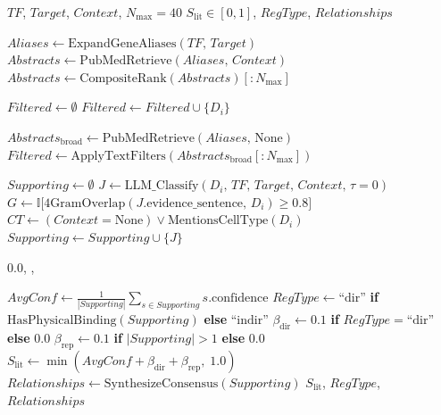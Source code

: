 \documentclass{article}
\begin{document}
\begin{algorithm}[H]
\caption{Reflexive Agentic Literature Validation and Scoring}
\label{alg:lit_val}
\begin{algorithmic}[1]
\Require $TF$, $Target$, $Context$, $N_{\max} = 40$
\Ensure $S_{\mathrm{lit}} \in [0,1]$, $RegType$, $Relationships$

\State $Aliases \leftarrow \mathrm{ExpandGeneAliases}(TF,\, Target)$
\State $Abstracts \leftarrow \mathrm{PubMedRetrieve}(Aliases,\, Context)$
\State $Abstracts \leftarrow \mathrm{CompositeRank}(Abstracts)[:N_{\max}]$

\State $Filtered \leftarrow \emptyset$
      \State $Filtered \leftarrow Filtered \cup \{D_i\}$
    \EndIf
  \EndIf
\EndFor

  \State {}
  \State $Abstracts_{\mathrm{broad}} \leftarrow \mathrm{PubMedRetrieve}(Aliases,\, \text{None})$
  \State $Filtered \leftarrow \mathrm{ApplyTextFilters}(Abstracts_{\mathrm{broad}}[:N_{\max}])$
\EndIf

\State $Supporting \leftarrow \emptyset$
  \State $J \leftarrow \mathrm{LLM\_Classify}(D_i,\, TF,\, Target,\, Context,\, \tau{=}0)$
    \State $G \leftarrow \mathbb{I}\bigl[\mathrm{4GramOverlap}(J.\mathrm{evidence\_sentence},\, D_i) \ge 0.8\bigr]$
    \State $CT \leftarrow (Context = \text{None}) \vee \mathrm{MentionsCellType}(D_i)$
      \State $Supporting \leftarrow Supporting \cup \{J\}$
    \EndIf
  \EndIf
\EndFor

  \State \Return $0.0$, , 
\EndIf

\State $AvgConf \leftarrow \tfrac{1}{|Supporting|} \displaystyle\sum_{s \in Supporting} s.\mathrm{confidence}$
\State $RegType \leftarrow \text{``dir''}$ \textbf{if} $\mathrm{HasPhysicalBinding}(Supporting)$
       \textbf{else} $\text{``indir''}$
\State $\beta_{\mathrm{dir}} \leftarrow 0.1$ \textbf{if} $RegType = \text{``dir''}$ \textbf{else} $0.0$
\State $\beta_{\mathrm{rep}} \leftarrow 0.1$ \textbf{if} $|Supporting| > 1$ \textbf{else} $0.0$
\State $S_{\mathrm{lit}} \leftarrow \min(AvgConf + \beta_{\mathrm{dir}} + \beta_{\mathrm{rep}},\; 1.0)$
\State $Relationships \leftarrow \mathrm{SynthesizeConsensus}(Supporting)$
\State \Return $S_{\mathrm{lit}}$, $RegType$, $Relationships$
\end{algorithmic}
\end{algorithm}
\end{document}
